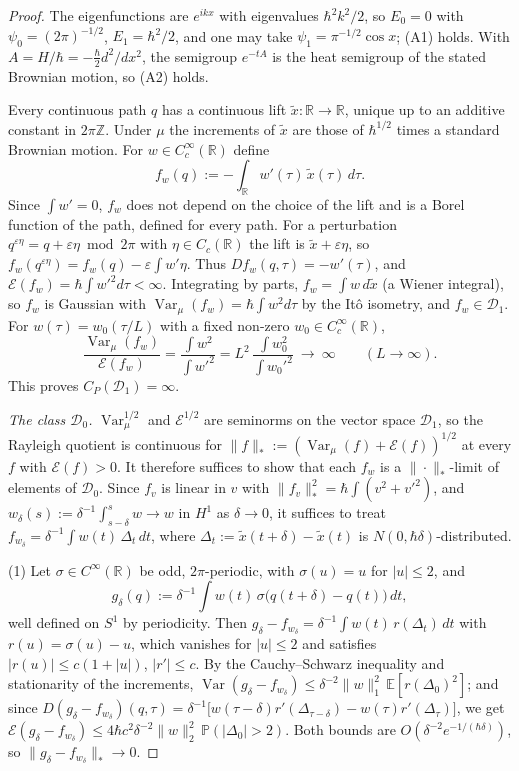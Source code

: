\documentclass[11pt,a4paper]{article}
\theoremstyle{definition}
\theoremstyle{remark}
\newcommand{\E}{\mathbb{E}}
\newcommand{\R}{\mathbb{R}}
\newcommand{\Var}{\operatorname{Var}}
\newcommand{\cE}{\mathcal{E}}
\newcommand{\cD}{\mathcal{D}}
\begin{document}
\begin{proof}
The eigenfunctions are $e^{ikx}$ with eigenvalues $\hbar^2k^2/2$, so $E_0=0$ with $\psi_0=(2\pi)^{-1/2}$, $E_1=\hbar^2/2$, and one may take $\psi_1=\pi^{-1/2}\cos x$; (A1) holds.
With $A=H/\hbar=-\tfrac{\hbar}{2}d^2/dx^2$, the semigroup $e^{-tA}$ is the heat semigroup of the stated Brownian motion, so (A2) holds.

Every continuous path $q$ has a continuous lift $\tilde x:\R\to\R$, unique up to an additive constant in $2\pi\mathbb Z$.
Under $\mu$ the increments of $\tilde x$ are those of $\hbar^{1/2}$ times a standard Brownian motion.
For $w\in C_c^\infty(\R)$ define
\[
  f_w(q):=-\int_\R w'(\tau)\,\tilde x(\tau)\,d\tau .
\]
Since $\int w'=0$, $f_w$ does not depend on the choice of the lift and is a Borel function of the path, defined for every path.
For a perturbation $q^{\varepsilon\eta}=q+\varepsilon\eta\bmod2\pi$ with $\eta\in C_c(\R)$ the lift is $\tilde x+\varepsilon\eta$, so $f_w(q^{\varepsilon\eta})=f_w(q)-\varepsilon\int w'\eta$.
Thus $Df_w(q,\tau)=-w'(\tau)$, and $\cE(f_w)=\hbar\int w'^2d\tau<\infty$.
Integrating by parts, $f_w=\int w\,d\tilde x$ (a Wiener integral), so $f_w$ is Gaussian with $\Var_\mu(f_w)=\hbar\int w^2d\tau$ by the It\^o isometry, and $f_w\in\cD_1$.
For $w(\tau)=w_0(\tau/L)$ with a fixed non-zero $w_0\in C_c^\infty(\R)$,
\[
  \frac{\Var_\mu(f_w)}{\cE(f_w)}=\frac{\int w^2}{\int w'^2}=L^2\,\frac{\int w_0^2}{\int w_0'^2}\ \longrightarrow\ \infty\qquad(L\to\infty).
\]
This proves $C_P(\cD_1)=\infty$.

\emph{The class $\cD_0$.}
$\Var_\mu^{1/2}$ and $\cE^{1/2}$ are seminorms on the vector space $\cD_1$, so the Rayleigh quotient is continuous for $\|f\|_*:=(\Var_\mu(f)+\cE(f))^{1/2}$ at every $f$ with $\cE(f)>0$.
It therefore suffices to show that each $f_w$ is a $\|\cdot\|_*$-limit of elements of $\cD_0$.
Since $f_v$ is linear in $v$ with $\|f_v\|_*^2=\hbar\int(v^2+v'^2)$, and $w_\delta(s):=\delta^{-1}\int_{s-\delta}^sw\to w$ in $H^1$ as $\delta\to0$, it suffices to treat $f_{w_\delta}=\delta^{-1}\int w(t)\,\Delta_t\,dt$, where $\Delta_t:=\tilde x(t+\delta)-\tilde x(t)$ is $N(0,\hbar\delta)$-distributed.

(1) Let $\sigma\in C^\infty(\R)$ be odd, $2\pi$-periodic, with $\sigma(u)=u$ for $|u|\le2$, and
\[
  g_\delta(q):=\delta^{-1}\int w(t)\,\sigma\bigl(q(t+\delta)-q(t)\bigr)\,dt ,
\]
well defined on $S^1$ by periodicity.
Then $g_\delta-f_{w_\delta}=\delta^{-1}\int w(t)\,r(\Delta_t)\,dt$ with $r(u)=\sigma(u)-u$, which vanishes for $|u|\le2$ and satisfies $|r(u)|\le c(1+|u|)$, $|r'|\le c$.
By the Cauchy--Schwarz inequality and stationarity of the increments, $\Var(g_\delta-f_{w_\delta})\le\delta^{-2}\|w\|_1^2\,\E[r(\Delta_0)^2]$; and since $D(g_\delta-f_{w_\delta})(q,\tau)=\delta^{-1}\bigl[w(\tau-\delta)r'(\Delta_{\tau-\delta})-w(\tau)r'(\Delta_\tau)\bigr]$, we get $\cE(g_\delta-f_{w_\delta})\le4\hbar c^2\delta^{-2}\|w\|_2^2\,\mathbb P(|\Delta_0|>2)$.
Both bounds are $O(\delta^{-2}e^{-1/(\hbar\delta)})$, so $\|g_\delta-f_{w_\delta}\|_*\to0$.


\end{proof}
\end{document}
